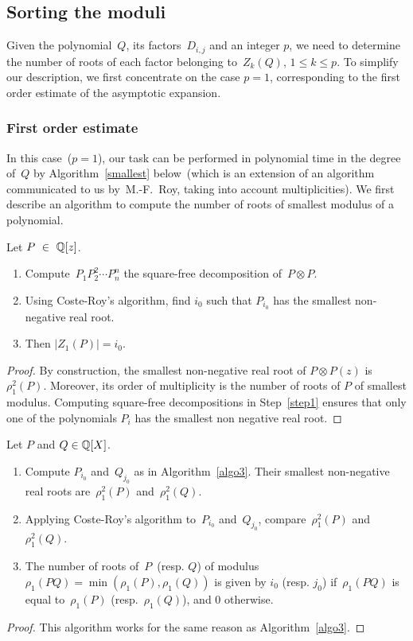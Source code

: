 \subsection{Sorting the moduli}
Given the polynomial~$Q$, its factors~$D_{i,j}$ and an integer $p$, we
need to determine the number of roots of each factor belonging
to~$Z_k(Q)$, $1\le k\le p$. To simplify our description, we first
concentrate on the case $p=1$, corresponding to the first order
estimate of the asymptotic expansion.
\subsubsection{First order estimate}
\label{2.1.1}
In this case~($p=1$), our task can be
performed in polynomial time in the degree of~$Q$ by 
Algorithm~\ref{smallest} below~(which is an extension of an
algorithm communicated to us by~M.-F.~Roy, taking into account
multiplicities). We first describe an algorithm to compute the number
of roots of smallest modulus of a polynomial.

\begin{alg}\label{algo3}
Let $P \ \in \ {\Bbb Q}[z]$.
\begin{enumerate}
\item\label{step1} Compute~$P_1P_2^2 \cdots P_n^n$ the square-free
decomposition of~$P\otimes P$.
\item Using Coste-Roy's algorithm, find $i_0$ such that $P_{i_0}$ has the
smallest non-negative real root.
\item Then $|Z_1(P)|=i_0$.
\end{enumerate}
\end{alg}
\begin{proof}
By construction, the smallest non-negative real root of $P\otimes P(z)$ is
$\rho_1^2(P)$. Moreover, its order of multiplicity is
the number of roots of $P$ of smallest modulus.
Computing  square-free decompositions in Step~\ref{step1} ensures that
only one of the polynomials $P_i$ has the smallest non
negative real root.
\end{proof}

\begin{alg}\label{smallest}
Let $P$ and $Q \in {\Bbb Q}[X]$. 
\begin{enumerate}
\item Compute $P_{i_0}$ and~$Q_{j_0}$ as in Algorithm~\ref{algo3}.
Their smallest non-negative real roots are~$\rho_1^2(P)$
and~$\rho_1^2(Q)$.
\item Applying Coste-Roy's algorithm to~$P_{i_0}$ and~$Q_{j_0}$,
compare~$\rho_1^2(P)$
and~$\rho_1^2(Q)$.
\item  The number of roots of~$P$~(resp. $Q$) of
modulus~$\rho_1(PQ)=\min(\rho_1(P),\rho_1(Q))$ is given by $i_0$
(resp. $j_0$) if~$\rho_1(PQ)$ is equal to~$\rho_1(P)$
(resp.~$\rho_1(Q)$), and 0 otherwise.
\end{enumerate}
\end{alg}
\begin{proof} This algorithm works for the same reason as
Algorithm~\ref{algo3}.
\end{proof}

